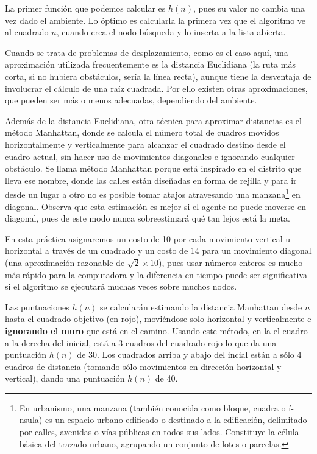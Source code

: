 La primer función que podemos calcular es \(h(n)\), pues su valor no cambia una vez dado el ambiente.  Lo óptimo es calcularla la primera vez que el algoritmo ve al cuadrado \(n\), cuando crea el nodo búsqueda y lo inserta a la lista abierta.

Cuando se trata de problemas de desplazamiento, como es el caso aquí, una aproximación utilizada frecuentemente es la distancia Euclidiana (la ruta más corta, si no hubiera obstáculos, sería la línea recta), aunque tiene la desventaja de involucrar el cálculo de una raíz cuadrada. Por ello existen otras aproximaciones, que pueden ser más o menos adecuadas, dependiendo del ambiente.

Además de la distancia Euclidiana, otra técnica para aproximar distancias es el método Manhattan, donde se calcula el número total de cuadros movidos horizontalmente y verticalmente para alcanzar el cuadrado destino desde el cuadro actual, sin hacer uso de movimientos diagonales e ignorando cualquier obstáculo. Se llama método Manhattan porque está inspirado en el distrito que lleva ese nombre, donde las calles están diseñadas en forma de rejilla y para ir desde un lugar a otro no es posible tomar atajos atravesando una manzana\footnote{En urbanismo, una manzana (también conocida como bloque, cuadra o í­nsula) es un espacio urbano edificado o destinado a la edificación, delimitado por calles, avenidas o vías públicas en todos sus lados. Constituye la célula básica del trazado urbano, agrupando un conjunto de lotes o parcelas.} en diagonal.  Observa que esta estimación es mejor si el agente no puede moverse en diagonal, pues de este modo nunca sobreestimará qué tan lejos está la meta.

En esta práctica asignaremos un costo de 10 por cada movimiento vertical u horizontal a través de un cuadrado y un costo de 14 para un movimiento diagonal (una aproximación razonable de \(\sqrt{2}\times10\)), pues usar números enteros es mucho más rápido para la computadora y la diferencia en tiempo puede ser significativa si el algoritmo se ejecutará muchas veces sobre muchos nodos.

Las puntuaciones \(h(n)\) se calcularán estimando la distancia Manhattan desde $n$ hasta el cuadrado objetivo (en rojo), moviéndose solo horizontal y verticalmente e \textbf{ignorando el muro} que está en el camino. Usando este método, en la  el cuadro a la derecha del inicial, está a 3 cuadros del cuadrado rojo lo que da una puntuación \(h(n)\) de 30. Los cuadrados arriba y abajo del incial están a sólo 4 cuadros de distancia (tomando sólo movimientos en dirección horizontal y vertical), dando una puntuación \(h(n)\) de 40.


